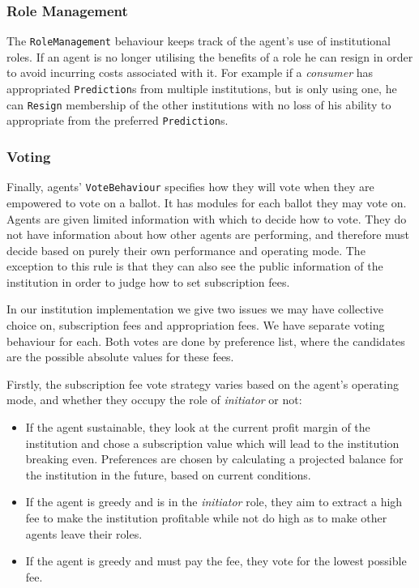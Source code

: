 \subsubsection*{Role Management}

The \texttt{RoleManagement} behaviour keeps track of the agent's use of
institutional roles. If an agent is no longer utilising the benefits of a role
he can resign in order to avoid incurring costs associated with it. For
example if a \emph{consumer} has appropriated \texttt{Prediction}s from
multiple institutions, but is only using one, he can \texttt{Resign}
membership of the other institutions with no loss of his ability to
appropriate from the preferred \texttt{Prediction}s.

\subsubsection*{Voting}

Finally, agents' \texttt{VoteBehaviour} specifies how they will vote when they
are empowered to vote on a ballot. It has modules for each ballot they may
vote on. Agents are given limited information with which to decide how to
vote. They do not have information about how other agents are performing, and
therefore must decide based on purely their own performance and operating mode. The exception to
this rule is that they can also see the public information of the institution
in order to judge how to set subscription fees. 

In our institution implementation we give two issues we may have collective
choice on, subscription fees and appropriation fees. We have separate voting
behaviour for each. Both votes are done by preference list, where the
candidates are the possible absolute values for these fees.

Firstly, the subscription fee vote strategy varies based on the agent's
operating mode, and whether they occupy the role of \emph{initiator} or not:

\begin{itemize}
\item If the agent sustainable, they look at the current profit margin of the institution and chose a subscription value which will lead to the institution breaking even. Preferences are chosen by calculating a projected balance for the institution in the future, based on current conditions.
\item If the agent is greedy and is in the \emph{initiator} role, they aim to extract a high fee to make the institution profitable while not do high as to make other agents leave their roles.
\item If the agent is greedy and must pay the fee, they vote for the lowest possible fee.
\end{itemize}

